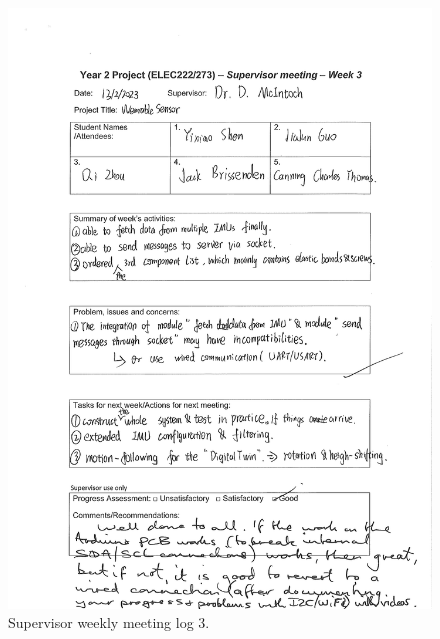 \documentclass[12pt, a4paper]{report}
\begin{document}
\begin{figure}[htbp]
	\centering
	\includegraphics[width=\textwidth]{
		appendix/meeting-log-3}
	\caption{Supervisor weekly meeting log 3.}
	\label{fig:meeting-log-3}
\end{figure}
\end{document}
